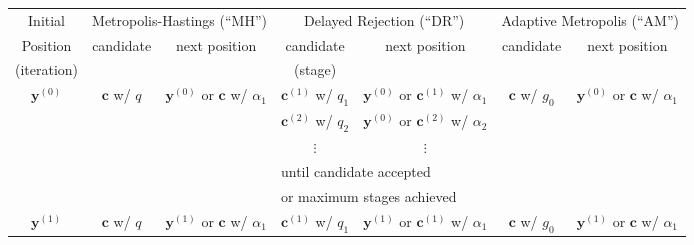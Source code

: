 \begin{sidewaystable}[h]
\begin{tabular}{|c||c|c||c|c||c|c|}
\hline
 Initial             & \multicolumn{2}{c||}{Metropolis-Hastings (``MH'')}                & \multicolumn{2}{c||}{Delayed Rejection (``DR'')}                         & \multicolumn{2}{c|}{Adaptive Metropolis (``AM'')}          \\
\cline{2-7}
 Position            & candidate               & next position                           & candidate              & next position                                   & candidate        & next position                           \\
(iteration)          &                         &                                         & (stage)                &                                                 &                  &                                         \\
\hline
\hline
$\mathbf{y}^{(0)}$       & $\mathbf{c}$ w/ $q$              & $\mathbf{y}^{(0)}$ or $\mathbf{c}$ w/ $\alpha_1$       & $\mathbf{c}^{(1)}$ w/ $q_1$     & $\mathbf{y}^{(0)}$ or $\mathbf{c}^{(1)}$ w/ $\alpha_1$       & $\mathbf{c}$ w/ $g_0$     & $\mathbf{y}^{(0)}$ or $\mathbf{c}$ w/ $\alpha_1$       \\
\cline{4-5}
                     &                         &                                         & $\mathbf{c}^{(2)}$ w/ $q_2$     & $\mathbf{y}^{(0)}$ or $\mathbf{c}^{(2)}$ w/ $\alpha_2$       &                  &                                         \\
\cline{4-5}
                     &                         &                                         & $\vdots$               & $\vdots$                                        &                  &                                         \\
\cline{4-5}
                     &                         &                                         & \multicolumn{2}{l||}{until candidate accepted}                           &                  &                                         \\
                     &                         &                                         & \multicolumn{2}{l||}{or maximum stages achieved}                         &                  &                                         \\
\hline 
\hline
$\mathbf{y}^{(1)}$       & $\mathbf{c}$ w/ $q$              & $\mathbf{y}^{(1)}$ or $\mathbf{c}$ w/ $\alpha_1$       & $\mathbf{c}^{(1)}$ w/ $q_1$     & $\mathbf{y}^{(1)}$ or $\mathbf{c}^{(1)}$ w/ $\alpha_1$       & $\mathbf{c}$ w/ $g_0$     & $\mathbf{y}^{(1)}$ or $\mathbf{c}$ w/ $\alpha_1$       \\

\end{tabular}
\end{sidewaystable}
